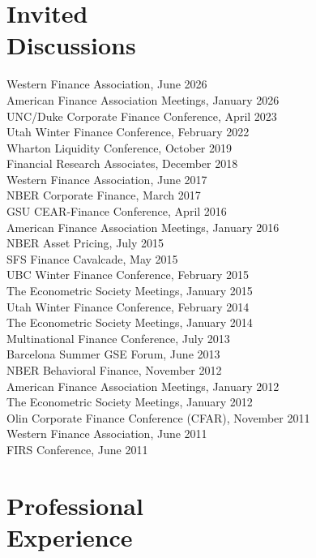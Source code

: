 \documentclass[margin,line,11pt]{resume}
\begin{document}
\begin{resume}
\section{\mysidestyle Invited \\Discussions}
Western Finance Association, June 2026 \\
American Finance Association Meetings, January 2026 \\
UNC/Duke Corporate Finance Conference, April 2023 \\ %
Utah Winter Finance Conference, February 2022 \\ %
Wharton Liquidity Conference, October 2019 \\ %
Financial Research Associates, December 2018 \\%
Western Finance Association, June 2017 \\ %
NBER Corporate Finance, March 2017 \\
GSU CEAR-Finance Conference, April 2016 \\
American Finance Association Meetings, January 2016 \\
NBER Asset Pricing, July 2015 \\
SFS Finance Cavalcade, May 2015 \\
UBC Winter Finance Conference, February 2015 \\
The Econometric Society Meetings, January 2015 \\
Utah Winter Finance Conference, February 2014 \\
The Econometric Society Meetings, January 2014 \\
Multinational Finance Conference, July 2013 \\
Barcelona Summer GSE Forum, June 2013 \\
NBER Behavioral Finance, November 2012 \\
American Finance Association Meetings, January 2012 \\
The Econometric Society Meetings, January 2012 \\
Olin Corporate Finance Conference (CFAR), November 2011 \\
Western Finance Association, June 2011 \\
FIRS Conference, June 2011  \\


    \section{\mysidestyle Professional\\Experience}


\end{resume}
\end{document}
